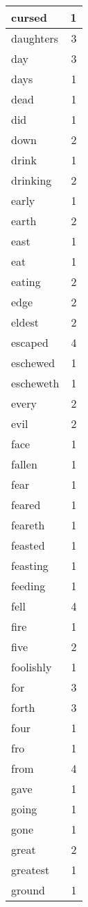 \begin{center}
\begin{longtable}{l|r}
cursed & 1\\ \hline 
daughters & 3\\ \hline 
day & 3\\ \hline 
days & 1\\ \hline 
dead & 1\\ \hline 
did & 1\\ \hline 
down & 2\\ \hline 
drink & 1\\ \hline 
drinking & 2\\ \hline 
early & 1\\ \hline 
earth & 2\\ \hline 
east & 1\\ \hline 
eat & 1\\ \hline 
eating & 2\\ \hline 
edge & 2\\ \hline 
eldest & 2\\ \hline 
escaped & 4\\ \hline 
eschewed & 1\\ \hline 
escheweth & 1\\ \hline 
every & 2\\ \hline 
evil & 2\\ \hline 
face & 1\\ \hline 
fallen & 1\\ \hline 
fear & 1\\ \hline 
feared & 1\\ \hline 
feareth & 1\\ \hline 
feasted & 1\\ \hline 
feasting & 1\\ \hline 
feeding & 1\\ \hline 
fell & 4\\ \hline 
fire & 1\\ \hline 
five & 2\\ \hline 
foolishly & 1\\ \hline 
for & 3\\ \hline 
forth & 3\\ \hline 
four & 1\\ \hline 
fro & 1\\ \hline 
from & 4\\ \hline 
gave & 1\\ \hline 
going & 1\\ \hline 
gone & 1\\ \hline 
great & 2\\ \hline 
greatest & 1\\ \hline 
ground & 1\\ \hline 

\end{longtable}
\end{center}
